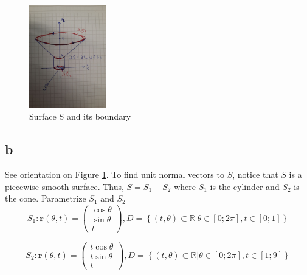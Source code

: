 \documentclass{article}
\begin{document}
\begin{figure}[H]
  \centering
  \includegraphics[width=0.3\textwidth]{calculus/W7/img/S}
  \caption{Surface S and its boundary}
  \label{fig:s}
\end{figure}

\subsection{b}
See orientation on Figure \ref{fig:s}. To find unit normal vectors to $S$, notice that $S$ is a piecewise smooth surface. Thus, $S = S_1 + S_2$ where $S_1$ is the cylinder and $S_2$ is the cone. Parametrize $S_1$ and $S_2$ 
\begin{equation*}
  S_1: \mathbf{r}(\theta, t) = \begin{pmatrix} \cos \theta \\ \sin \theta \\ t  \end{pmatrix}, D = \left\{ (t, \theta) \subset \mathbb{R} | \theta \in \left[ 0 ; 2\pi \right], t \in \left[ 0; 1 \right]  \right\}
\end{equation*}

\begin{equation*}
  S_2: \mathbf{r}(\theta, t) = \begin{pmatrix} t\cos \theta \\ t\sin \theta \\ t  \end{pmatrix}, D = \left\{ (t, \theta) \subset \mathbb{R} | \theta \in \left[ 0 ; 2\pi \right], t \in \left[ 1; 9 \right]  \right\}
\end{equation*}
\end{document}
